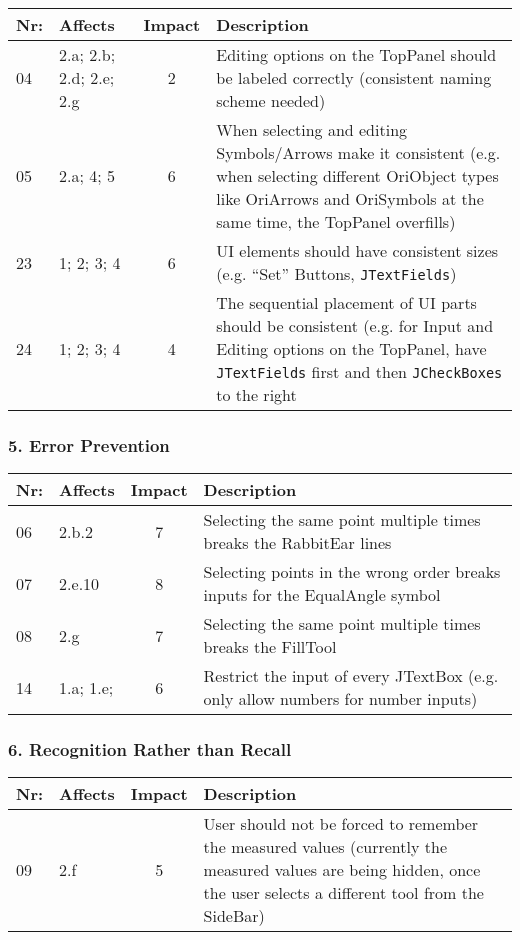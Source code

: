         \begin{tabular}{l | p{} | c | p{}}
        Nr: & Affects & Impact & Description \\ \hline
        04 & 2.a; 2.b; 2.d; 2.e; 2.g  & 2 & Editing options on the TopPanel should be labeled correctly (consistent naming scheme needed)\\ \hline 
	05 & 2.a; 4; 5 & 6 & When selecting and editing Symbols/Arrows make it consistent (e.g. when selecting different OriObject types like OriArrows and OriSymbols at the same time, the TopPanel overfills) \\ \hline
	23 & 1; 2; 3; 4 & 6 & UI elements should have consistent sizes (e.g. ``Set'' Buttons, \texttt{JTextFields})\\ \hline
	24 & 1; 2; 3; 4 & 4 & The sequential placement of UI parts should be consistent (e.g. for Input and Editing options on the TopPanel, have \texttt{JTextFields} first and then \texttt{JCheckBoxes} to the right\\ \hline
        \end{tabular}

\subsubsection*{5. Error Prevention}

        \begin{tabular}{l | p{} | c | p{}}
        Nr: & Affects & Impact & Description \\ \hline
        06 & 2.b.2 & 7 & Selecting the same point multiple times breaks the RabbitEar lines \\ \hline
        07 & 2.e.10  & 8 & Selecting points in the wrong order breaks inputs for the EqualAngle symbol \\ \hline 
        08 & 2.g & 7 & Selecting the same point multiple times breaks the FillTool \\ \hline
        14 & 1.a; 1.e; & 6 & Restrict the input of every JTextBox (e.g. only allow numbers for number inputs)\\ \hline
        \end{tabular}
\subsubsection*{6. Recognition Rather than Recall}

        \begin{tabular}{l | p{} | c | p{}}
        Nr: & Affects & Impact & Description \\ \hline
        09 & 2.f  & 5 & User should not be forced to remember the measured values (currently the measured values are being hidden, once the user selects a different tool from the SideBar)\\ \hline 
        \end{tabular}


